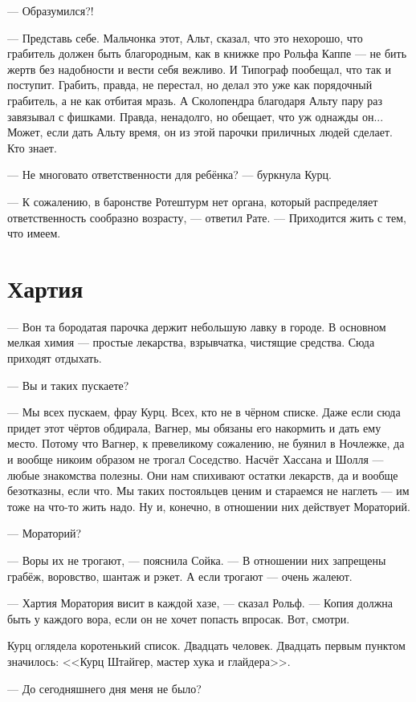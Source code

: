 --- Образумился?!

--- Представь себе.
Мальчонка этот, Альт, сказал, что это нехорошо, что грабитель должен быть благородным, как в книжке про Рольфа Каппе --- не бить жертв без надобности и вести себя вежливо.
И Типограф пообещал, что так и поступит.
Грабить, правда, не перестал, но делал это уже как порядочный грабитель, а не как отбитая мразь.
А Сколопендра благодаря Альту пару раз завязывал с фишками.
Правда, ненадолго, но обещает, что уж однажды он...
Может, если дать Альту время, он из этой парочки приличных людей сделает.
Кто знает.

--- Не многовато ответственности для ребёнка? --- буркнула Курц.

--- К сожалению, в баронстве Ротештурм нет органа, который распределяет ответственность сообразно возрасту, --- ответил Рате.
--- Приходится жить с тем, что имеем.

\section{Хартия}

--- Вон та бородатая парочка держит небольшую лавку в городе.
В основном мелкая химия --- простые лекарства, взрывчатка, чистящие средства.
Сюда приходят отдыхать.

--- Вы и таких пускаете?

--- Мы всех пускаем, фрау Курц.
Всех, кто не в чёрном списке.
Даже если сюда придет этот чёртов обдирала, Вагнер, мы обязаны его накормить и дать ему место.
Потому что Вагнер, к превеликому сожалению, не буянил в Ночлежке, да и вообще никоим образом не трогал Соседство.
Насчёт Хассана и Шолля --- любые знакомства полезны.
Они нам спихивают остатки лекарств, да и вообще безотказны, если что.
Мы таких постояльцев ценим и стараемся не наглеть --- им тоже на что-то жить надо.
Ну и, конечно, в отношении них действует Мораторий.

--- Мораторий?

--- Воры их не трогают, --- пояснила Сойка.
--- В отношении них запрещены грабёж, воровство, шантаж и рэкет.
А если трогают --- очень жалеют.

--- Хартия Моратория висит в каждой хазе, --- сказал Рольф.
--- Копия должна быть у каждого вора, если он не хочет попасть впросак.
Вот, смотри.

Курц оглядела коротенький список.
Двадцать человек.
Двадцать первым пунктом значилось: <<Курц Штайгер, мастер хука и глайдера>>.

--- До сегодняшнего дня меня не было?

